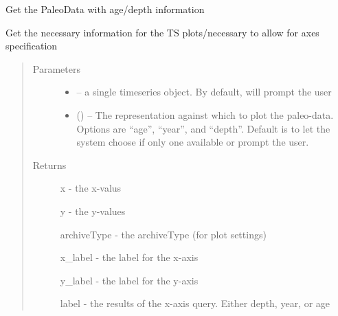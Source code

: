 \documentclass[letterpaper,10pt,english]{sphinxmanual}
\begin{document}
\begin{fulllineitems}
\label{\detokenize{SummaryPlots:pyleoclim.SummaryPlots.TsData}}
Get the PaleoData with age/depth information

Get the necessary information for the TS plots/necessary to allow for
axes specification
\begin{quote}\begin{description}
\item[{Parameters}] \leavevmode\begin{itemize}
\item {} 
 -- a single timeseries object.
By default, will prompt the user

\item {} 
 () -- The representation against which to plot the
paleo-data. Options are ``age'', ``year'', and ``depth''.
Default is to let the system choose if only one available
or prompt the user.

\end{itemize}

\item[{Returns}] \leavevmode

x - the x-valus

y - the y-values

archiveType - the archiveType (for plot settings)

x\_label - the label for the x-axis

y\_label - the label for the y-axis

label - the results of the x-axis query. Either depth, year, or age


\end{description}\end{quote}

\end{fulllineitems}

\end{document}
